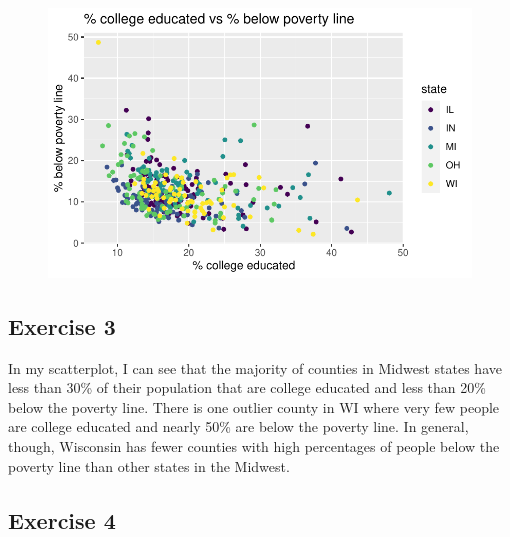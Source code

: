\documentclass[
  letterpaper,
  DIV=11,
  numbers=noendperiod]{scrartcl}
\begin{document}
\begin{figure}[H]

{\centering \includegraphics{lab-1_files/figure-pdf/scatterplot-college degree-below-poverty-1.pdf}

}

\end{figure}

\hypertarget{exercise-3}{%
\subsection{Exercise 3}\label{exercise-3}}

In my scatterplot, I can see that the majority of counties in Midwest
states have less than 30\% of their population that are college educated
and less than 20\% below the poverty line. There is one outlier county
in WI where very few people are college educated and nearly 50\% are
below the poverty line. In general, though, Wisconsin has fewer counties
with high percentages of people below the poverty line than other states
in the Midwest.

\hypertarget{exercise-4}{%
\subsection{Exercise 4}\label{exercise-4}}
\end{document}
